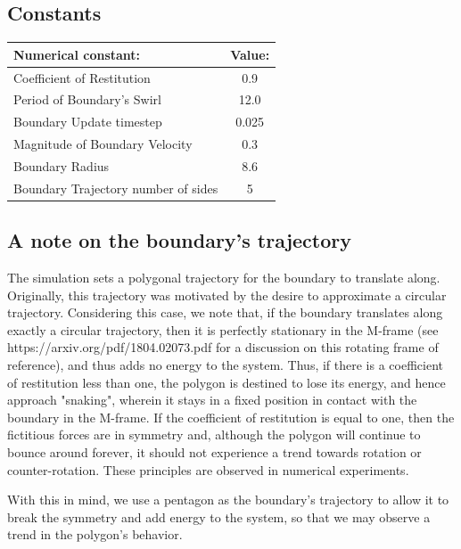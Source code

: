 \documentclass{article}
\begin{document}
\subsection*{Constants}
\begin{center}
  \begin{tabular}{ | l | c | }
    \hline
    Numerical constant: & Value:  \\ \hline \hline
    Coefficient of Restitution & 0.9  \\ \hline
    Period of Boundary's Swirl & 12.0  \\
    \hline
    Boundary Update timestep & 0.025 \\
    \hline
    Magnitude of Boundary Velocity & 0.3 \\ \hline Boundary Radius & 8.6 \\ \hline
    Boundary Trajectory number of sides & 5 \\ \hline
  \end{tabular}
\end{center}
\subsection*{A note on the boundary's trajectory}
The simulation sets a polygonal trajectory for the boundary to translate along. Originally, this trajectory was motivated by the desire to approximate a circular trajectory. Considering this case, we note that, if the boundary translates along exactly a circular trajectory, then it is perfectly stationary in the M-frame (see https://arxiv.org/pdf/1804.02073.pdf for a discussion on this rotating frame of reference), and thus adds no energy to the system. Thus, if there is a coefficient of restitution less than one, the polygon is destined to lose its energy, and hence approach "snaking", wherein it stays in a fixed position in contact with the boundary in the M-frame. If the coefficient of restitution is equal to one, then the fictitious forces are in symmetry and, although the polygon will continue to bounce around forever, it should not experience a trend towards rotation or counter-rotation. These principles are observed in numerical experiments. 

With this in mind, we use a pentagon as the boundary's trajectory to allow it to break the symmetry and add energy to the system, so that we may observe a trend in the polygon's behavior. 
\end{document}
